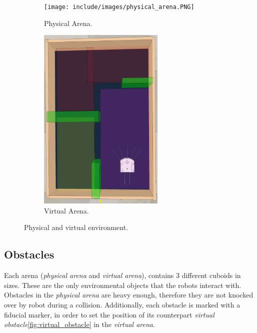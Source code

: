 \begin{figure}[H]
    \centering
    \begin{subfigure}[b]{0.4\textwidth}
    	\centering
        \texttt{[image: include/images/physical\_arena.PNG]}
        \caption{Physical Arena.}
        \label{fig:physical_arena}
    \end{subfigure}
    \begin{subfigure}[b]{0.4\textwidth}
    	\centering
        \includegraphics[width=6cm]{include/images/virtual_arena.PNG}
        \caption{Virtual Arena.}
        \label{fig:virtual_arena}
    \end{subfigure}
    \caption{Physical and virtual environment.}\label{sistemass1}
\end{figure}

\subsection{Obstacles}

Each arena (\emph{physical arena} and \emph{virtual arena}), contains 3 different cuboids in sizes. These are the only environmental objects that the robots interact with. Obstacles in the \emph{physical arena} are heavy enough, therefore they are not knocked over by  robot during a collision. Additionally, each obstacle is marked with a fiducial marker, in order to set the position of its counterpart \emph{virtual obstacle}\ref{fig:virtual_obstacle} in the \emph{virtual arena}.

